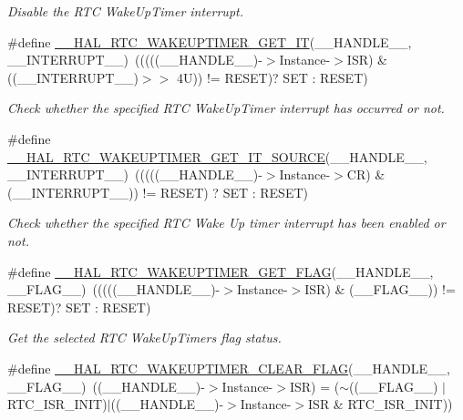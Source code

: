 \begin{DoxyCompactItemize}
\begin{DoxyCompactList}\small\item\em Disable the R\+TC Wake\+Up\+Timer interrupt. \end{DoxyCompactList}\item 
\#define \hyperlink{group___r_t_c_ex___wake_up___timer_gaac6051af0e8efabdae50b7051554355b}{\+\_\+\+\_\+\+H\+A\+L\+\_\+\+R\+T\+C\+\_\+\+W\+A\+K\+E\+U\+P\+T\+I\+M\+E\+R\+\_\+\+G\+E\+T\+\_\+\+IT}(\+\_\+\+\_\+\+H\+A\+N\+D\+L\+E\+\_\+\+\_\+,  \+\_\+\+\_\+\+I\+N\+T\+E\+R\+R\+U\+P\+T\+\_\+\+\_\+)~(((((\+\_\+\+\_\+\+H\+A\+N\+D\+L\+E\+\_\+\+\_\+)-\/$>$Instance-\/$>$I\+SR) \& ((\+\_\+\+\_\+\+I\+N\+T\+E\+R\+R\+U\+P\+T\+\_\+\+\_\+)$>$$>$ 4\+U)) != R\+E\+S\+E\+T)? S\+E\+T \+: R\+E\+S\+E\+T)
\begin{DoxyCompactList}\small\item\em Check whether the specified R\+TC Wake\+Up\+Timer interrupt has occurred or not. \end{DoxyCompactList}\item 
\#define \hyperlink{group___r_t_c_ex___wake_up___timer_gafbe296c7719885437a245d5967194ac0}{\+\_\+\+\_\+\+H\+A\+L\+\_\+\+R\+T\+C\+\_\+\+W\+A\+K\+E\+U\+P\+T\+I\+M\+E\+R\+\_\+\+G\+E\+T\+\_\+\+I\+T\+\_\+\+S\+O\+U\+R\+CE}(\+\_\+\+\_\+\+H\+A\+N\+D\+L\+E\+\_\+\+\_\+,  \+\_\+\+\_\+\+I\+N\+T\+E\+R\+R\+U\+P\+T\+\_\+\+\_\+)~(((((\+\_\+\+\_\+\+H\+A\+N\+D\+L\+E\+\_\+\+\_\+)-\/$>$Instance-\/$>$CR) \& (\+\_\+\+\_\+\+I\+N\+T\+E\+R\+R\+U\+P\+T\+\_\+\+\_\+)) != R\+E\+S\+ET) ? S\+ET \+: R\+E\+S\+ET)
\begin{DoxyCompactList}\small\item\em Check whether the specified R\+TC Wake Up timer interrupt has been enabled or not. \end{DoxyCompactList}\item 
\#define \hyperlink{group___r_t_c_ex___wake_up___timer_ga217666f5b1e27e24441e2e9a3b51f28e}{\+\_\+\+\_\+\+H\+A\+L\+\_\+\+R\+T\+C\+\_\+\+W\+A\+K\+E\+U\+P\+T\+I\+M\+E\+R\+\_\+\+G\+E\+T\+\_\+\+F\+L\+AG}(\+\_\+\+\_\+\+H\+A\+N\+D\+L\+E\+\_\+\+\_\+,  \+\_\+\+\_\+\+F\+L\+A\+G\+\_\+\+\_\+)~(((((\+\_\+\+\_\+\+H\+A\+N\+D\+L\+E\+\_\+\+\_\+)-\/$>$Instance-\/$>$I\+SR) \& (\+\_\+\+\_\+\+F\+L\+A\+G\+\_\+\+\_\+)) != R\+E\+S\+ET)? S\+ET \+: R\+E\+S\+ET)
\begin{DoxyCompactList}\small\item\em Get the selected R\+TC Wake\+Up\+Timer\textquotesingle{}s flag status. \end{DoxyCompactList}\item 
\#define \hyperlink{group___r_t_c_ex___wake_up___timer_gabb56cd29b62b414c5da34e2fc1cabf16}{\+\_\+\+\_\+\+H\+A\+L\+\_\+\+R\+T\+C\+\_\+\+W\+A\+K\+E\+U\+P\+T\+I\+M\+E\+R\+\_\+\+C\+L\+E\+A\+R\+\_\+\+F\+L\+AG}(\+\_\+\+\_\+\+H\+A\+N\+D\+L\+E\+\_\+\+\_\+,  \+\_\+\+\_\+\+F\+L\+A\+G\+\_\+\+\_\+)~((\+\_\+\+\_\+\+H\+A\+N\+D\+L\+E\+\_\+\+\_\+)-\/$>$Instance-\/$>$I\+SR) = ($\sim$((\+\_\+\+\_\+\+F\+L\+A\+G\+\_\+\+\_\+) $\vert$ R\+T\+C\+\_\+\+I\+S\+R\+\_\+\+I\+N\+IT)$\vert$((\+\_\+\+\_\+\+H\+A\+N\+D\+L\+E\+\_\+\+\_\+)-\/$>$Instance-\/$>$I\+SR \& R\+T\+C\+\_\+\+I\+S\+R\+\_\+\+I\+N\+IT))
$$
\end{DoxyCompactItemize}

